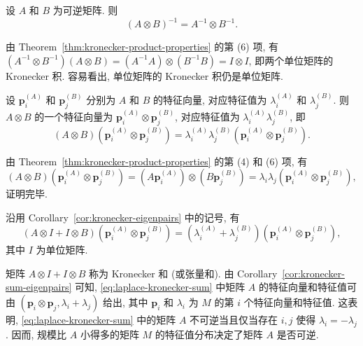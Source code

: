 \begin{Corollary}\label{cor:kronecker-inverse}
{设 $A$ 和 $B$ 为可逆矩阵. 则}
\[(A\otimes B)^{-1}=A^{-1}\otimes B^{-1}.\]
\end{Corollary}
\begin{Proof}
{由 Theorem\ \ref{thm:kronecker-product-properties} 的第 (6) 项, 有 $(A^{-1}\otimes B^{-1})(A\otimes B)=(A^{-1}A)\otimes(B^{-1}B)=I\otimes I$, 即两个单位矩阵的 Kronecker 积. 容易看出, 单位矩阵的 Kronecker 积仍是单位矩阵.}
\end{Proof}
\begin{Corollary}\label{cor:kronecker-eigenpairs}
{设 $\boldsymbol{p}_i^{(A)}$ 和 $\boldsymbol{p}_j^{(B)}$ 分别为 $A$ 和 $B$ 的特征向量, 对应特征值为 $\lambda_i^{(A)}$ 和 $\lambda_j^{(B)}$. 则 $A\otimes B$ 的一个特征向量为 $\boldsymbol{p}_i^{(A)}\otimes\boldsymbol{p}_j^{(B)}$, 对应特征值为 $\lambda_i^{(A)}\lambda_j^{(B)}$, 即}
\[(A\otimes B)\left(\boldsymbol{p}_i^{(A)}\otimes\boldsymbol{p}_j^{(B)}\right)=\lambda_i^{(A)}\lambda_j^{(B)}\left(\boldsymbol{p}_i^{(A)}\otimes\boldsymbol{p}_j^{(B)}\right).\]
\end{Corollary}
\begin{Proof}
{由 Theorem\ \ref{thm:kronecker-product-properties} 的第 (4) 和 (6) 项, 有}
\[(A\otimes B)\left(\boldsymbol{p}_i^{(A)}\otimes\boldsymbol{p}_j^{(B)}\right)=\left(A\boldsymbol{p}_i^{(A)}\right)\otimes\left(B\boldsymbol{p}_j^{(B)}\right)=\lambda_i\lambda_j\left(\boldsymbol{p}_i^{(A)}\otimes\boldsymbol{p}_j^{(B)}\right),\]
{证明完毕.}
\end{Proof}
\begin{Corollary}\label{cor:kronecker-sum-eigenpairs}
{沿用 Corollary\ \ref{cor:kronecker-eigenpairs} 中的记号, 有}
\[(A\otimes I+I\otimes B)\left(\boldsymbol{p}_i^{(A)}\otimes\boldsymbol{p}_j^{(B)}\right)=\left(\lambda_i^{(A)}+\lambda_j^{(B)}\right)\left(\boldsymbol{p}_i^{(A)}\otimes\boldsymbol{p}_j^{(B)}\right),\]
{其中 $I$ 为单位矩阵.}
\end{Corollary}
{矩阵 $A\otimes I+I\otimes B$ 称为 Kronecker 和 (或张量和). 由 Corollary\ \ref{cor:kronecker-sum-eigenpairs} 可知, \eqref{eq:laplace-kronecker-sum} 中矩阵 $A$ 的特征向量和特征值可由 $(\boldsymbol{p}_i\otimes\boldsymbol{p}_j,\lambda_i+\lambda_j)$ 给出, 其中 $\boldsymbol{p}_i$ 和 $\lambda_i$ 为 $M$ 的第 $i$ 个特征向量和特征值. 这表明, \eqref{eq:laplace-kronecker-sum} 中的矩阵 $A$ 不可逆当且仅当存在 $i,j$ 使得 $\lambda_i=-\lambda_j$. 因而, 规模比 $A$ 小得多的矩阵 $M$ 的特征值分布决定了矩阵 $A$ 是否可逆.}

